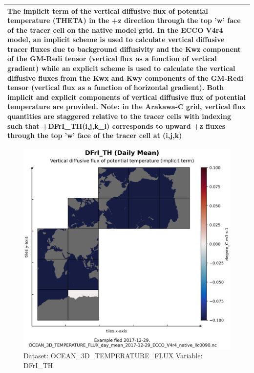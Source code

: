 \begin{longtable}{|p{}|p{}|p{}|p{}|}
\multicolumn{4}{|p{1\textwidth}|}{The implicit term of the vertical diffusive flux of potential temperature (THETA) in the +z direction through the top 'w' face of the tracer cell on the native model grid. In the ECCO V4r4 model, an implicit scheme is used to calculate vertical diffusive tracer fluxes due to background diffusivity and the Kwz component of the GM-Redi tensor (vertical flux as a function of vertical gradient) while an explicit scheme is used to calculate the vertical diffusive fluxes from the Kwx and Kwy components of the GM-Redi tensor (vertical flux as a function of horizontal gradient). Both implicit and explicit components of vertical diffusive flux of potential temperature are provided. Note: in the Arakawa-C grid, vertical flux quantities are staggered relative to the tracer cells with indexing such that +DFrI\_TH(i,j,k\_l) corresponds to upward +z fluxes through the top 'w' face of the tracer cell at (i,j,k)} \\ \hline
\end{longtable}

\begin{figure}[H]
\centering
\includegraphics[width=\textwidth]{../images/plots/native_plots/Ocean_Three-Dimensional_Potential_Temperature_Fluxes/DFrI_TH.png}
\caption{Dataset: OCEAN\_3D\_TEMPERATURE\_FLUX Variable: DFrI\_TH}
\label{tab:table-OCEAN_3D_TEMPERATURE_FLUX_DFrI_TH-Plot}
\end{figure}
\pagebreak
